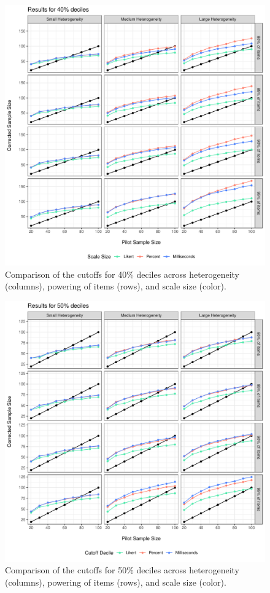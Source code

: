 \documentclass[
  man]{apa7}
\begin{document}
\begin{figure}
\centering
\includegraphics{manuscript_draft_files/figure-latex/decile40-figure-1.pdf}
\caption{\label{fig:decile40-figure}Comparison of the cutoffs for 40\% deciles across heterogeneity (columns), powering of items (rows), and scale size (color).}
\end{figure}

\begin{figure}
\centering
\includegraphics{manuscript_draft_files/figure-latex/decile50-figure-1.pdf}
\caption{\label{fig:decile50-figure}Comparison of the cutoffs for 50\% deciles across heterogeneity (columns), powering of items (rows), and scale size (color).}
\end{figure}
\end{document}

